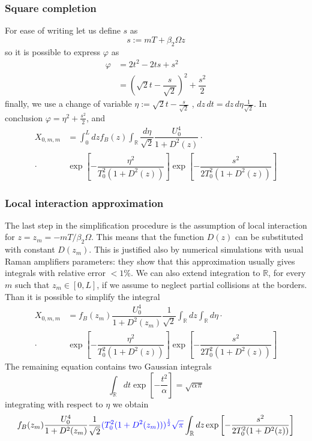 \documentclass[8pt]{beamer} %
\begin{document}
\begin{frame}
    \frametitle{Square completion}
    For ease of writing let us define $s$ as
    \begin{equation*}
        s := mT+\beta_2\Omega z
    \end{equation*}
    so it is possible to express $\varphi$ as
    \begin{align*}
        \varphi & = 2t^2 - 2ts + s^2                                                \\
                & = \left(\sqrt{2}t - \dfrac{s}{\sqrt{2}}\right)^2 + \dfrac{s^2}{2}
    \end{align*}
    finally, we use a change of variable $\eta := \sqrt{2}t - \frac{s}{\sqrt{2}}$
    ,  $dz\,dt = dz\,d\eta \frac{1}{\sqrt{2}}$.
    In conclusion $\varphi = \eta^2 + \frac{s^2}{2}$, and
    \begin{align*}
        X_{0, m, m} & = \int_{0}^{L}dz f_B(z) \int_{\mathbb{R}}\dfrac{d\eta}{\sqrt{2}}
        \dfrac{U_0^4}{1+D^2(z)} \cdot                                                  \\ \cdot  &\exp\left[-\dfrac{\eta^2}{T_0^2(1+D^2(z))} \right] \exp\left[-\dfrac{s^2}{2T_0^2(1+D^2(z))} \right]
    \end{align*}
\end{frame}

\begin{frame}
    \frametitle{Local interaction approximation}

    The last step in the simplification procedure is the assumption of local interaction for $z=z_m=-mT/\beta_2\Omega$. This means that the function $D(z)$ can be substituted with constant $D(z_m)$. This is justified also by numerical simulations with usual Raman amplifiers parameters: they show that this approximation usually gives integrals with relative error $<1\%$.
    We can also extend integration to $\mathbb{R}$, for every $m$ such that $z_m \in [0, L]$, if we assume to neglect partial collisions at the borders.
    Than it is possible to simplify the integral
    \begin{align*}
        X_{0, m, m} & = f_B(z_m) \dfrac{U_0^4}{1+D^2(z_m)}  \dfrac{1}{\sqrt{2}}\int_{\mathbb{R}}dz \int_{\mathbb{R}}d\eta
        \cdot                                                                                                             \\ \cdot  &\exp\left[-\dfrac{\eta^2}{T_0^2(1+D^2(z))} \right] \exp\left[-\dfrac{s^2}{2T_0^2(1+D^2(z))} \right]
    \end{align*}
    The remaining equation contains two Gaussian integrals
    \begin{equation}
        \int_{\mathbb{R}}dt \exp\left[-\dfrac{t^2}{\alpha}\right] = \sqrt{\alpha \pi}
    \end{equation}
    integrating with respect to $\eta$ we obtain
    \begin{equation}
        f_B(z_m) \dfrac{U_0^4}{1+D^2(z_m)}  \dfrac{1}{\sqrt{2}}  {\color{blue}(T_0^2(1+D^2(z_m)))^{\frac{1}{2}}\sqrt{\pi}} \int_{\mathbb{R}}dz   \exp\left[-\dfrac{s^2}{2T_0^2(1+D^2(z))} \right]
    \end{equation}
\end{frame}
\end{document}
